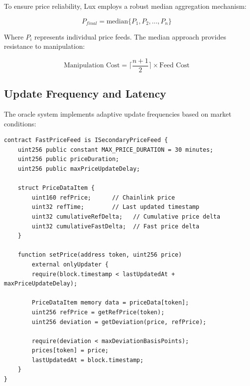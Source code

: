 To ensure price reliability, Lux employs a robust median aggregation mechanism:

\begin{equation}
P_{final} = \text{median}\{P_1, P_2, ..., P_n\}
\end{equation}

Where $P_i$ represents individual price feeds. The median approach provides resistance to manipulation:

\begin{equation}
\text{Manipulation Cost} = \lceil \frac{n+1}{2} \rceil \times \text{Feed Cost}
\end{equation}

\subsection{Update Frequency and Latency}

The oracle system implements adaptive update frequencies based on market conditions:

\begin{lstlisting}[caption={Fast Price Feed Implementation}]
contract FastPriceFeed is ISecondaryPriceFeed {
    uint256 public constant MAX_PRICE_DURATION = 30 minutes;
    uint256 public priceDuration;
    uint256 public maxPriceUpdateDelay;
    
    struct PriceDataItem {
        uint160 refPrice;      // Chainlink price
        uint32 refTime;        // Last updated timestamp
        uint32 cumulativeRefDelta;   // Cumulative price delta
        uint32 cumulativeFastDelta;  // Fast price delta
    }
    
    function setPrice(address token, uint256 price) 
        external onlyUpdater {
        require(block.timestamp < lastUpdatedAt + maxPriceUpdateDelay);
        
        PriceDataItem memory data = priceData[token];
        uint256 refPrice = getRefPrice(token);
        uint256 deviation = getDeviation(price, refPrice);
        
        require(deviation < maxDeviationBasisPoints);
        prices[token] = price;
        lastUpdatedAt = block.timestamp;
    }
}
\end{lstlisting}

